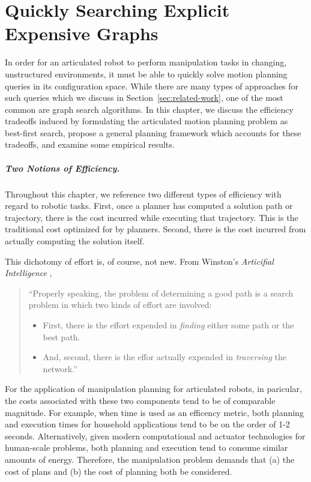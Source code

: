 \chapter{Quickly Searching Explicit Expensive Graphs}
\label{chap:inflate}

In order for an articulated robot to perform manipulation tasks
in changing, unstructured environments,
it must be able to quickly solve motion planning queries in its
configuration space.
While there are many types of approaches for such queries
which we discuss in Section~\ref{sec:related-work},
one of the most common are graph search algorithms.
In this chapter,
we discuss the efficiency tradeoffs induced by formulating
the articulated motion planning problem as best-first search,
propose a general planning framework which accounts for these tradeoffs,
and examine some empirical results.

\paragraph{Two Notions of Efficiency.}

Throughout this chapter,
we reference two different types of efficiency
with regard to robotic tasks.
First, once a planner has computed a solution path or trajectory,
there is the cost incurred while executing that trajectory.
This is the traditional cost optimized for by planners.
Second, there is the cost incurred from actually computing the solution
itself.

This dichotomy of effort is, of course, not new.
From Winston's \emph{Articifial Intelligence} \cite{winston1977ai},
\begin{quote}
   ``Properly speaking, the problem of determining a good path is a search
   problem in which two kinds of effort are involved:
   \begin{itemize}
   \item First, there is the effort expended in \emph{finding} either
      some path or the best path.
   \item And, second, there is the effor actually expended in
      \emph{traversing} the network.''
   \end{itemize}
\end{quote}

For the application of manipulation planning for articulated robots,
in paricular,
the costs associated with these two components tend to be of comparable
magnitude.
For example,
when time is used as an efficency metric,
both planning and execution times for household applications
tend to be on the order of 1-2 seconds.
Alternatively, given
modern computational and actuator technologies for human-scale problems,
both planning and execution tend to consume similar amounts of energy.
Therefore,
the manipulation problem demands that
(a) the cost of plans and
(b) the cost of planning both be considered.

